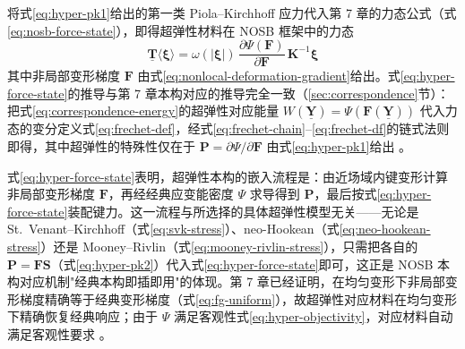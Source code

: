 将式\eqref{eq:hyper-pk1}给出的第一类 Piola--Kirchhoff 应力代入第 7 章的力态公式（式\eqref{eq:nosb-force-state}），即得超弹性材料在 NOSB 框架中的力态
\begin{equation}
  \underline{\mathbf{T}}\langle\boldsymbol{\xi}\rangle
  =\omega(|\boldsymbol{\xi}|)\,\frac{\partial\Psi(\mathbf{F})}{\partial\mathbf{F}}\,\mathbf{K}^{-1}\boldsymbol{\xi}
  \label{eq:hyper-force-state}
\end{equation}
其中非局部变形梯度 $\mathbf{F}$ 由式\eqref{eq:nonlocal-deformation-gradient}给出。式\eqref{eq:hyper-force-state}的推导与第 7 章本构对应的推导完全一致（\ref{sec:correspondence}节）：把式\eqref{eq:correspondence-energy}的超弹性对应能量 $W(\underline{\mathbf{Y}})=\Psi(\mathbf{F}(\underline{\mathbf{Y}}))$ 代入力态的变分定义式\eqref{eq:frechet-def}，经式\eqref{eq:frechet-chain}--\eqref{eq:frechet-df}的链式法则即得，其中超弹性的特殊性仅在于 $\mathbf{P}=\partial\Psi/\partial\mathbf{F}$ 由式\eqref{eq:hyper-pk1}给出 \cite{Silling2007}。

式\eqref{eq:hyper-force-state}表明，超弹性本构的嵌入流程是：由近场域内键变形计算非局部变形梯度 $\mathbf{F}$，再经经典应变能密度 $\Psi$ 求导得到 $\mathbf{P}$，最后按式\eqref{eq:hyper-force-state}装配键力。这一流程与所选择的具体超弹性模型无关——无论是 St.~Venant--Kirchhoff（式\eqref{eq:svk-stress}）、neo-Hookean（式\eqref{eq:neo-hookean-stress}）还是 Mooney--Rivlin（式\eqref{eq:mooney-rivlin-stress}），只需把各自的 $\mathbf{P}=\mathbf{F}\mathbf{S}$（式\eqref{eq:hyper-pk2}）代入式\eqref{eq:hyper-force-state}即可，这正是 NOSB 本构对应机制"经典本构即插即用"的体现。第 7 章已经证明，在均匀变形下非局部变形梯度精确等于经典变形梯度（式\eqref{eq:fg-uniform}），故超弹性对应材料在均匀变形下精确恢复经典响应；由于 $\Psi$ 满足客观性式\eqref{eq:hyper-objectivity}，对应材料自动满足客观性要求 \cite{Silling2007}。

